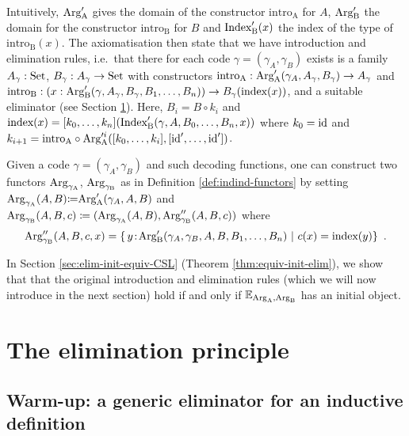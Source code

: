 \documentclass[orivec,envcountsame, ,envcountsect]{llncs}
\begin{document}
Intuitively, $\text{Arg}_{\text{A}}'$ gives the domain of the constructor
$\text{intro}_{\text{A}}$ for $A$, $\text{Arg}_{\text{B}}'$ the domain for the
constructor $\text{intro}_{\text{B}}$ for $B$ and $\text{Index}'_{\text{B}}(x)$ the
index of the type of $\text{intro}_{\text{B}}(x)$.  The axiomatisation
then state that we have introduction and elimination rules, i.e.\ that
there for each code $\gamma = (\gamma_A, \gamma_B)$ exists is a family
$A_\gamma : \text{Set}$, $B_\gamma : A_\gamma \to \text{Set}$ with constructors
$\text{intro}_{\text{A}} : \text{Arg}_{\text{A}}'(\gamma_A, A_\gamma, B_\gamma) \to
A_\gamma$ and $\text{intro}_{\text{B}} : (x : \text{Arg}_{\text{B}}'(\gamma,
A_\gamma, B_\gamma, B_1, \ldots, B_n)) \to B_\gamma(\text{index}(x))$,
and a suitable eliminator (see Section \ref{sec:eliminator}). Here,
$B_i = B \circ k_i$ and $\text{index}(x) = [k_0,
  \ldots, k_n](\text{Index}'_{\text{B}}(\gamma, A, B_0, \ldots, B_n, x))$ where $k_0 = \text{id}$ and $k_{i+1}
= \text{intro}_{\text{A}} \circ \text{Arg}_{\text{A}}'^i([k_0,
  \ldots, k_{i}], [\text{id}', \ldots, \text{id}'])$.

Given a code $\gamma = (\gamma_A, \gamma_B)$ and such decoding functions, one
can construct two functors $\text{Arg}_{\gamma_\text{A}}$, $\text{Arg}_{\gamma_\text{B}}$ as in Definition \ref{def:indind-functors}
by setting $\text{Arg}_{\gamma_\text{A}}(A, B) {\coloneqq} \text{Arg}_{\text{A}}'(\gamma_A, A, B)$ and
$\text{Arg}_{\gamma_\text{B}}(A, B, c) \coloneqq (\text{Arg}_{\gamma_\text{A}}(A, B), \text{Arg}_{\gamma_\text{B}}''(A, B, c))$ where
\[
\text{Arg}_{\gamma_\text{B}}''(A, B, c, x) = \{\, y\!:\!\text{Arg}_{\text{B}}'(\gamma_A, \gamma_B, A, B, B_1, \ldots, B_n)
                                                \ |\  c(x) = \text{index}(y) \} \enspace .
\]


In Section \ref{sec:elim-init-equiv-CSL} (Theorem
\ref{thm:equiv-init-elim}), we show that that the original
introduction and elimination rules (which we will now introduce in the
next section) hold %
if and only if $\mathbb{E}_{\text{Arg}_{\text{A}}, \text{Arg}_{\text{B}}}$ has an initial object.


\section{The elimination principle}
\label{sec:eliminator}


\subsection{Warm-up: a generic eliminator for an inductive definition}
\label{sec:elim-ind-intro}
\end{document}
